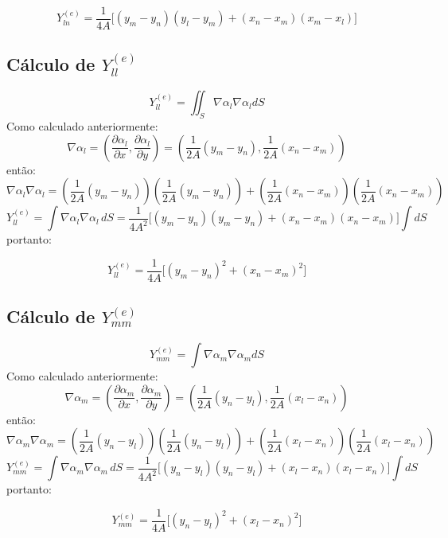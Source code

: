 \documentclass[
12pt,
a4paper,
oneside,
chapter=TITLE,
sumario=tradicional
]{abntex2}
\begin{document}
\begin{equation}
	\boxed{Y_{ln}^{(e)} = \frac{1}{4A}\Big[(y_m - y_n)(y_l - y_m) + (x_n - x_m)(x_m - x_l)\Big] }
	\label{eq:C_002}
\end{equation}

\subsection*{Cálculo de $Y_{ll}^{(e)}$}

$$ 
\boxed{Y_{ll}^{(e)} = \iint_S \nabla \alpha_l \nabla \alpha_l dS}
$$
Como calculado anteriormente:
$$
\boxed{\nabla \alpha_l = \left( \frac{\partial \alpha_l}{\partial x}, \frac{\partial \alpha_l}{\partial y} \right)
	= \left( \frac{1}{2A}(y_m - y_n), \frac{1}{2A}(x_n - x_m) \right)}
$$
então:
$$
\nabla \alpha_l \nabla \alpha_l =
\left(\frac{1}{2A}(y_m - y_n)\right)\left(\frac{1}{2A}(y_m - y_n)\right) +
\left(\frac{1}{2A}(x_n - x_m)\right)\left(\frac{1}{2A}(x_n - x_m)\right)
$$
$$
Y_{ll}^{(e)} = \int \nabla \alpha_l \nabla \alpha_l \, dS
= \frac{1}{4A^2} \Big[ (y_m - y_n)(y_m - y_n) + (x_n - x_m)(x_n - x_m) \Big] \int dS
$$
portanto:

\begin{equation}
	\boxed{Y_{ll}^{(e)} = \frac{1}{4A}\Big[(y_m - y_n)^2 + (x_n - x_m)^2\Big] }
	\label{eq:C_003}
\end{equation}


\subsection*{Cálculo de $Y_{mm}^{(e)}$}


$$ 
\boxed{Y_{mm}^{(e)} = \int \nabla \alpha_m \nabla \alpha_m dS}
$$
Como calculado anteriormente:
$$
\boxed{\nabla \alpha_m = \left( \frac{\partial \alpha_m}{\partial x}, \frac{\partial \alpha_m}{\partial y} \right)
	= \left( \frac{1}{2A}(y_n - y_l), \frac{1}{2A}(x_l - x_n) \right)}
$$
então:
$$
\nabla \alpha_m \nabla \alpha_m =
\left(\frac{1}{2A}(y_n - y_l)\right)\left(\frac{1}{2A}(y_n - y_l)\right) +
\left(\frac{1}{2A}(x_l - x_n)\right)\left(\frac{1}{2A}(x_l - x_n)\right)
$$
$$
Y_{mm}^{(e)} = \int \nabla \alpha_m \nabla \alpha_m \, dS
= \frac{1}{4A^2} \Big[ (y_n - y_l)(y_n - y_l) + (x_l - x_n)(x_l - x_n) \Big] \int dS
$$
portanto:

\begin{equation}
	\boxed{Y_{mm}^{(e)} = \frac{1}{4A}\Big[(y_n - y_l)^2 + (x_l - x_n)^2\Big]} 
	\label{eq:C_004}
\end{equation}
\end{document}
